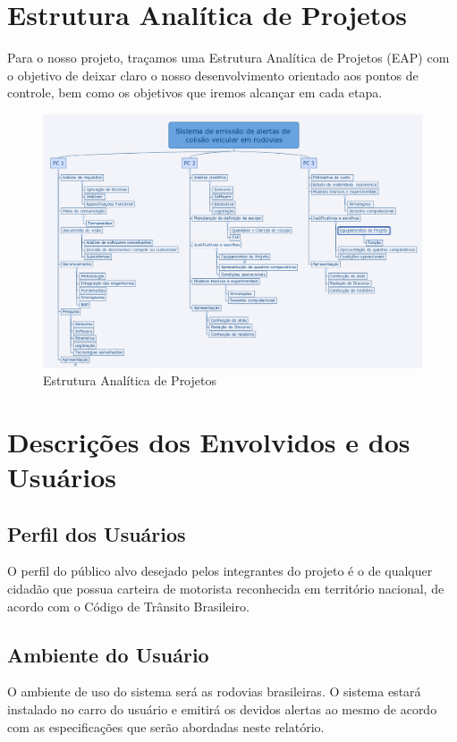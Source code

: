 \section{Estrutura Analítica de Projetos}
Para o nosso projeto, traçamos uma Estrutura Analítica de Projetos (EAP) com o objetivo de deixar claro o nosso
desenvolvimento orientado aos pontos de controle, bem como os objetivos que iremos alcançar em cada etapa.


\begin{figure}[h]
  \centering
  \includegraphics[width=450px, scale=0.5]{figuras/eap}
  \caption{Estrutura Analítica de Projetos}
  \label{fig:eap}
\end{figure}

\section{Descrições dos Envolvidos e dos Usuários}

\subsection{Perfil dos Usuários}
O perfil do público alvo desejado pelos integrantes do projeto é o de qualquer cidadão que possua carteira de motorista reconhecida em território nacional, de acordo com o Código de Trânsito Brasileiro\cite{ctb}.

\subsection{Ambiente do Usuário}
O ambiente de uso do sistema será as rodovias brasileiras. O sistema estará instalado no carro do usuário e emitirá os devidos alertas ao mesmo de acordo com as especificações que serão abordadas neste relatório.

